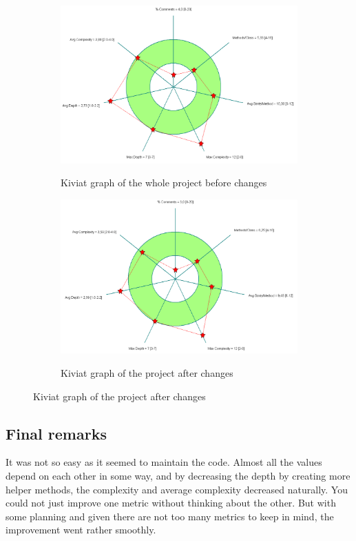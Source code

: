 \documentclass[UKenglish]{article}  %
\begin{document}
\begin{figure}[h]
	\begin{subfigure}[b]{0.5\textwidth}
		\caption{Kiviat graph of the whole project before changes}
		\includegraphics[width=\textwidth]{kiviat_project_baseline}
		\label{project_before}
	\end{subfigure}
	\begin{subfigure}[b]{0.5\textwidth}
		\caption{Kiviat graph of the project after changes}
		\includegraphics[width=\textwidth]{kiviat_project_after}
		\label{project_after}
	\end{subfigure}
\end{figure}


\subsection{Final remarks}
It was not so easy as it seemed to maintain the code. Almost all the values
depend on each other in some way, and by decreasing the depth by creating more
helper methods, the complexity and average complexity decreased naturally. You
could not just improve one metric without thinking about the other. But with
some planning and given there are not too many metrics to keep in mind, the
improvement went rather smoothly.
\end{document}
